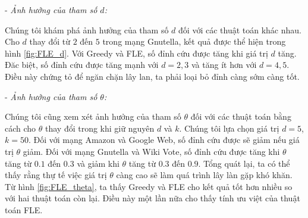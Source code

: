 - {\itshape Ảnh hưởng của tham số $d$:}

Chúng tôi khám phá ảnh hưởng của tham số $d$ đối với các thuật toán khác nhau. Cho $d$ thay đổi từ $2$ đến $5$ trong mạng Gnutella, kết quả được thể hiện trong hình \ref{fig:FLE_d}. Với Greedy và FLE, số đỉnh cứu được tăng khi giá trị $d$ tăng. Đăc biệt, số đỉnh cứu được tăng mạnh với $d=2,3$ và tăng ít hơn với $d=4,5$. Điều này chứng tỏ để ngăn chặn lây lan, ta phải loại bỏ đỉnh càng sớm càng tốt.


- {\itshape Ảnh hưởng của tham số $\theta$:}

Chúng tôi cũng xem xét ảnh hưởng của tham số $\theta$ đối với các thuật toán bằng cách cho $\theta$ thay đổi trong khi giữ nguyên $d$ và $k$. Chúng tôi lựa chọn giá trị $d=5$, $k=50$. Đối với mạng Amazon và Google Web, số đỉnh cứu được sẽ giảm nếu giá trị $\theta$ giảm. Đối với mạng Gnutella và Wiki Vote, số đỉnh cứu được tăng khi $\theta$ tăng từ $0.1$ đến $0.3$ và giảm khi $\theta$ tăng từ $0.3$ đến $0.9$. Tổng quát lại, ta có thể thấy rằng thự tế việc giá trị $\theta$ càng cao sẽ làm quá trình lây làn gặp khó khăn. Từ hình \ref{fig:FLE_theta}, ta thấy Greedy và FLE cho kết quả tốt hơn nhiều so với hai thuật toán còn lại. Điều này một lần nữa cho thấy tính ưu việt của thuật toán FLE.

